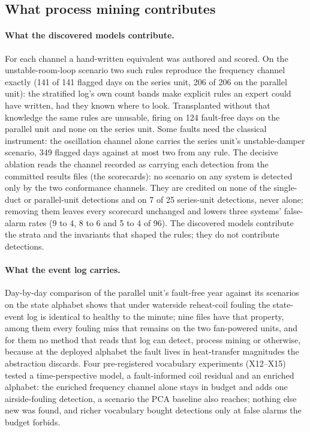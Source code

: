 \documentclass[11pt,letterpaper]{article}
\begin{document}
\subsection{What process mining contributes}

\paragraph{What the discovered models contribute.} For each channel a hand-written equivalent was authored and scored. On the unstable-room-loop scenario two such rules reproduce the frequency channel exactly (141 of 141 flagged days on the series unit, 206 of 206 on the parallel unit): the stratified log's own count bands make explicit rules an expert could have written, had they known where to look. Transplanted without that knowledge the same rules are unusable, firing on 124 fault-free days on the parallel unit and none on the series unit. Some faults need the classical instrument: the oscillation channel alone carries the series unit's unstable-damper scenario, 349 flagged days against at most two from any rule. The decisive ablation reads the channel recorded as carrying each detection from the committed results files (the scorecards): no scenario on any system is detected only by the two conformance channels. They are credited on none of the single-duct or parallel-unit detections and on 7 of 25 series-unit detections, never alone; removing them leaves every scorecard unchanged and lowers three systems' false-alarm rates (9 to 4, 8 to 6 and 5 to 4 of 96). The discovered models contribute the strata and the invariants that shaped the rules; they do not contribute detections.

\paragraph{What the event log carries.} Day-by-day comparison of the parallel unit's fault-free year against its scenarios on the state alphabet shows that under waterside reheat-coil fouling the state-event log is identical to healthy to the minute; nine files have that property, among them every fouling miss that remains on the two fan-powered units, and for them no method that reads that log can detect, process mining or otherwise, because at the deployed alphabet the fault lives in heat-transfer magnitudes the abstraction discards. Four pre-registered vocabulary experiments (X12--X15) tested a time-perspective model, a fault-informed coil residual and an enriched alphabet: the enriched frequency channel alone stays in budget and adds one airside-fouling detection, a scenario the PCA baseline also reaches; nothing else new was found, and richer vocabulary bought detections only at false alarms the budget forbids.
\end{document}

